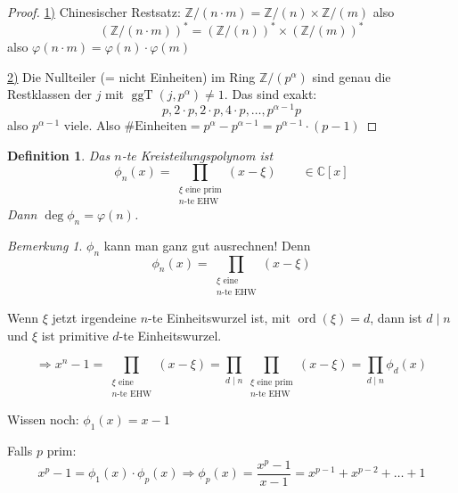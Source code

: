 \documentclass[a4paper,12pt,numbers=noenddot,parskip=full]{scrartcl}
\newcommand{\setZ}{\mathbb{Z}}
\newcommand{\setC}{\mathbb{C}}
\newcommand{\heading}{\underline}
\theoremstyle{dotless}
\newtheorem{definition}[theorem]{Definition}
\theoremstyle{remark}
\newtheorem*{remark}{Bemerkung}
\begin{document}
	\begin{proof}
		\heading{1)} Chinesischer Restsatz: $\setZ/(n \cdot m) = \setZ/(n) \times \setZ/(m)$ also
		\begin{equation*}
			\left( \setZ/(n \cdot m) \right)^* = \left( \setZ/(n) \right)^* \times \left( \setZ/(m) \right)^*
		\end{equation*}
		also $\varphi(n \cdot m) = \varphi(n) \cdot \varphi(m)$
		
		\heading{2)} Die Nullteiler (= nicht Einheiten) im Ring $\setZ/(p^\alpha)$ sind genau die Restklassen der $j$ mit $\operatorname{ggT}(j, p^\alpha) \neq 1$. Das sind exakt:
		\begin{equation*}
			p, 2 \cdot p, 2 \cdot p, 4 \cdot p, \dots, p^{\alpha-1} p
		\end{equation*}
		also $p^{\alpha-1}$ viele. Also $\#\text{Einheiten} = p^\alpha - p^{\alpha-1} = p^{\alpha - 1} \cdot (p-1)$
	\end{proof}

	\begin{definition}
		Das $n$-te Kreisteilungspolynom ist
		\begin{equation*}
			\phi_n(x) = \prod_{\substack{\xi \text{ eine prim} \\ \text{$n$-te EHW}}} (x - \xi) \qquad \in \setC[x]
		\end{equation*}
		Dann $\deg \phi_n = \varphi(n)$.
	\end{definition}

	\begin{remark}
		$\phi_n$ kann man ganz gut ausrechnen! Denn
		\begin{equation*}
			\phi_n(x) = \prod_{\substack{\xi \text{ eine} \\ \text{$n$-te EHW}}} (x - \xi)
		\end{equation*}
		
		Wenn $\xi$ jetzt irgendeine $n$-te Einheitswurzel ist, mit $\operatorname{ord}(\xi) = d$, dann ist $d \mid n$ und $\xi$ ist primitive $d$-te Einheitswurzel.
		
		\begin{equation*}
			\Rightarrow x^n - 1 = \prod_{\substack{\xi \text{ eine} \\ \text{$n$-te EHW}}} (x - \xi) = \prod_{d \mid n} \prod_{\substack{\xi \text{ eine prim} \\ \text{$n$-te EHW}}} (x - \xi) = \prod_{d \mid n} \phi_d(x)
		\end{equation*}
		
		Wissen noch: $\phi_1(x) = x - 1$
		
		Falls $p$ prim:
		\begin{equation*}
			x^p - 1 = \phi_1(x) \cdot \phi_p(x) \Rightarrow \phi_p(x) = \frac{x^p - 1}{x - 1} = x^{p-1} + x^{p-2} + \dots + 1
		\end{equation*}
	\end{remark}
\end{document}
